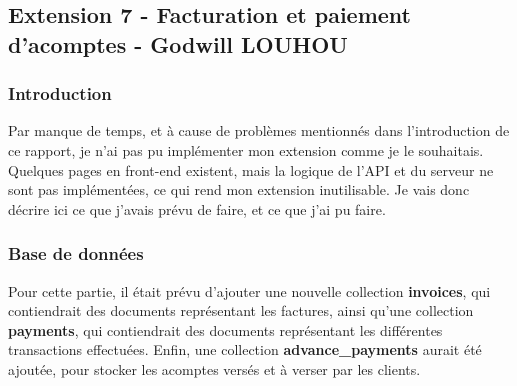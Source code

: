 \documentclass[../rapport.tex]{subfiles}
\begin{document}
\subsection{Extension 7 - Facturation et paiement d'acomptes - Godwill \textsc{LOUHOU}}
\subsubsection{Introduction}

Par manque de temps, et à cause de problèmes mentionnés dans l'introduction de ce rapport, je n'ai pas pu implémenter mon extension comme je le souhaitais. Quelques pages en front-end existent, mais la logique de l'API et du serveur ne sont pas implémentées, ce qui rend mon extension inutilisable. Je vais donc décrire ici ce que j'avais prévu de faire, et ce que j'ai pu faire. 

\subsubsection{Base de données}

Pour cette partie, il était prévu d'ajouter une nouvelle collection \textbf{invoices}, qui contiendrait des documents représentant les factures, ainsi qu'une collection \textbf{payments}, qui contiendrait des documents représentant les différentes transactions effectuées. Enfin, une collection \textbf{advance\_payments} aurait été ajoutée, pour stocker les acomptes versés et à verser par les clients.
\end{document}
